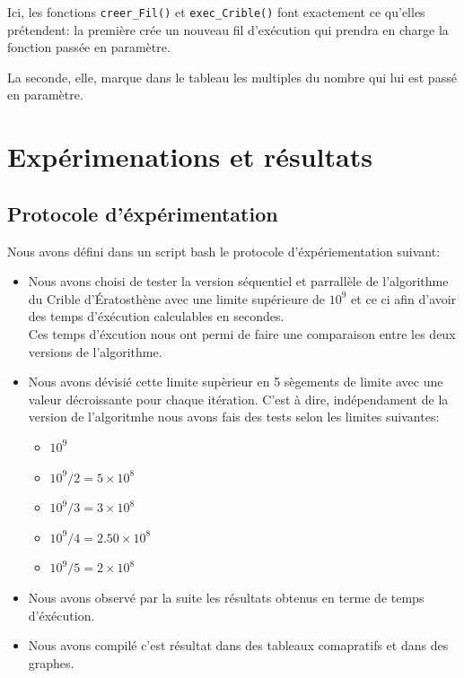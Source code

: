 \documentclass{report}
\def\code#1{\texttt{#1}} %
\begin{document}
		\bigskip
		Ici, les fonctions \code{creer\_Fil()} et \code{exec\_Crible()}
		font exactement ce qu'elles prétendent: la première crée un nouveau fil
		d'exécution qui prendra en charge la fonction passée en paramètre.

		\smallskip
		La seconde, elle, marque dans le tableau les multiples du nombre qui
		lui est passé en paramètre.

\chapter{Expérimenations et résultats}
\section{Protocole d'éxpérimentation}
Nous avons défini dans un script bash le protocole d'éxpériementation suivant:
\begin{itemize}
	\item Nous avons choisi de tester la version séquentiel et parrallèle de l'algorithme du Crible d'Ératosthène
	avec une limite supérieure de $10^{9}$ et ce ci afin d'avoir des temps d'éxécution calculables
	en secondes.\\
	Ces temps d'éxcution nous ont permi de faire une comparaison entre les deux versions de l'algorithme.
	\item Nous avons dévisié cette limite supèrieur en 5 sègements de limite avec une valeur décroissante pour chaque itération.
	C'est à dire, indépendament de la version de l'algoritmhe nous avons fais des tests selon les limites suivantes:
	\begin{itemize}
		\item $10^{9}$
		\item $10^{9}/2=5\times10^{8}$
		\item $10^{9}/3=3\times10^{8}$
		\item $10^{9}/4=2.50\times10^{8}$
		\item $10^{9}/5=2\times10^{8}$
	\end{itemize}
	\item Nous avons observé par la suite les résultats obtenus en terme de temps d'éxécution.
	\item Nous avons compilé c'est résultat dans des tableaux comapratifs et dans des graphes.
\end{itemize}
\newpage
\end{document}

